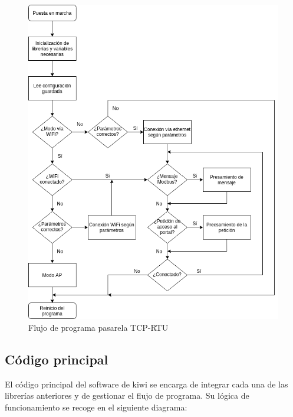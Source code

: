 \begin{figure}[H]
  \centering
  \includegraphics[width=15cm, keepaspectratio]{img/flujoProgramaPrincipal}
  \caption{Flujo de programa pasarela TCP-RTU}
  \label{figura:flujoLibreriaPuente}
\end{figure}

\subsection{Código principal}
\label{subsec:mainCodeKiwi}

El código principal del software de kiwi se encarga de integrar cada una de las librerías anteriores y de gestionar el flujo de programa. Su lógica de funcionamiento se recoge en el siguiente diagrama:


